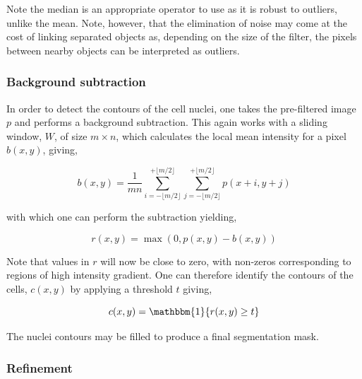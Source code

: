 Note the median is an appropriate operator to use as it is robust to outliers, unlike the mean. Note, however, that the elimination of noise may come at the cost of linking separated objects as, depending on the size of the filter, the pixels between nearby objects can be interpreted as outliers.

\subsubsection{Background subtraction}

In order to detect the contours of the cell nuclei, one takes the pre-filtered image $p$ and performs a background subtraction. This again works with a sliding window, $W$, of size $m\times n$, which calculates the local mean intensity for a pixel $b(x, y)$, giving,

\begin{equation}
b(x, y) = \frac{1}{mn}\sum_{i = -\lfloor m/2\rfloor}^{+\lfloor m/2\rfloor}\sum_{j= -\lfloor m/2\rfloor}^{+\lfloor m/2\rfloor} p(x +i, y + j)
\end{equation}

with which one can perform the subtraction yielding,

\begin{equation}
r(x, y) = \max(0, p(x, y) - b(x, y))
\end{equation}

Note that values in $r$ will now be close to zero, with non-zeros corresponding to regions of high intensity gradient. One can therefore identify the contours of the cells, $c(x, y)$ by applying a threshold $t$ giving,

\begin{equation}
c(x, y) = \mathbbm{1}\{r(x, y) \geq t\}
\end{equation}

The nuclei contours may be filled to produce a final segmentation mask.

\subsubsection{Refinement}

